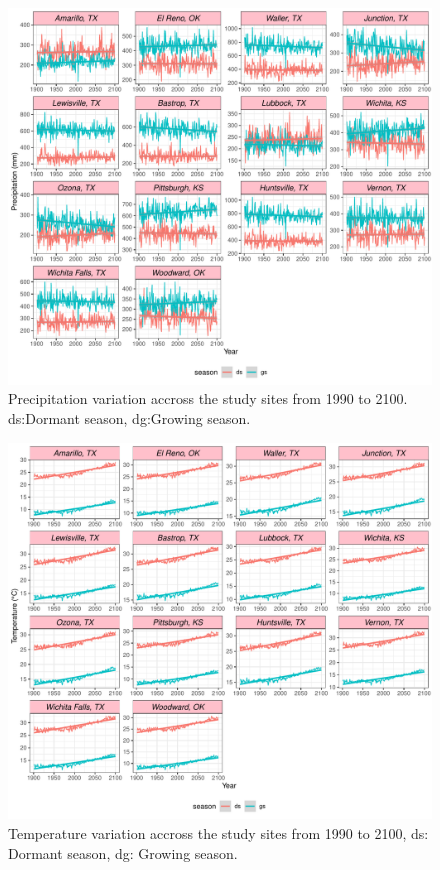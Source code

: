 \documentclass[12pt]{article}
\begin{document}
\begin{figure}[H]
		\centering
		\includegraphics[width=0.95\linewidth]{Figures/fig_pr_past_present_future.pdf}
		\caption{Precipitation variation accross the study sites from 1990 to 2100.
		ds:Dormant season, dg:Growing season.}
		\label{Sup:pr_variation}
\end{figure}


\begin{figure}[H]
		\centering
		\includegraphics[width=0.95\linewidth]{Figures/fig_tas_past_present_future.pdf}
		\caption{Temperature variation accross the study sites from 1990 to 2100,
		ds: Dormant season, dg: Growing season.}
		\label{Sup:temp_variation}
\end{figure}
\end{document}
